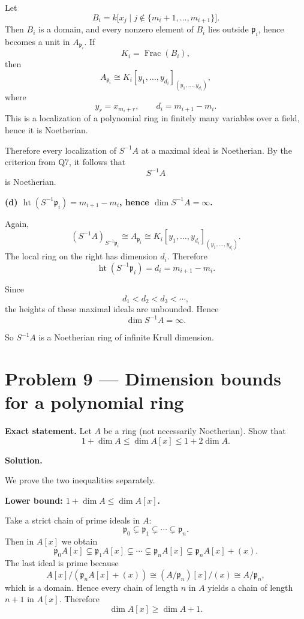 \documentclass[12pt,a4paper]{article}
\theoremstyle{plain}
\theoremstyle{definition}      %
\begin{document}
	Let
	\[
	B_i = k\big[x_j \mid j\notin \{m_i+1,\dots,m_{i+1}\}\big].
	\]
	Then \(B_i\) is a domain, and every nonzero element of \(B_i\) lies outside \(\mathfrak p_i\), hence becomes a unit in \(A_{\mathfrak p_i}\). If
	\[
	K_i=\operatorname{Frac}(B_i),
	\]
	then
	\[
	A_{\mathfrak p_i}
	\cong
	K_i[y_1,\dots,y_{d_i}]_{(y_1,\dots,y_{d_i})},
	\]
	where
	\[
	y_r=x_{m_i+r},
	\qquad
	d_i=m_{i+1}-m_i.
	\]
	This is a localization of a polynomial ring in finitely many variables over a field, hence it is Noetherian.
	
	Therefore every localization of \(S^{-1}A\) at a maximal ideal is Noetherian. By the criterion from Q7, it follows that
	\[
	S^{-1}A
	\]
	is Noetherian.
	
	\medskip
	
	\textbf{(d) \(\operatorname{ht}(S^{-1}\mathfrak p_i)=m_{i+1}-m_i\), hence \(\dim S^{-1}A=\infty\).}
	
	Again,
	\[
	(S^{-1}A)_{S^{-1}\mathfrak p_i}\cong A_{\mathfrak p_i}
	\cong
	K_i[y_1,\dots,y_{d_i}]_{(y_1,\dots,y_{d_i})}.
	\]
	The local ring on the right has dimension \(d_i\). Therefore
	\[
	\operatorname{ht}(S^{-1}\mathfrak p_i)=d_i=m_{i+1}-m_i.
	\]
	
	Since
	\[
	d_1<d_2<d_3<\cdots,
	\]
	the heights of these maximal ideals are unbounded. Hence
	\[
	\dim S^{-1}A=\infty.
	\]
	
	So \(S^{-1}A\) is a Noetherian ring of infinite Krull dimension.
	
	\bigskip
	
	\section*{Problem 9 --- Dimension bounds for a polynomial ring}
	
	\textbf{Exact statement.}
	Let \(A\) be a ring (not necessarily Noetherian). Show that
	\[
	1+\dim A \le \dim A[x] \le 1+2\dim A.
	\]
	
	\textbf{Solution.}
	
	We prove the two inequalities separately.
	
	\medskip
	
	\textbf{Lower bound: \(1+\dim A\le \dim A[x]\).}
	
	Take a strict chain of prime ideals in \(A\):
	\[
	\mathfrak p_0\subsetneq \mathfrak p_1\subsetneq \cdots \subsetneq \mathfrak p_n.
	\]
	Then in \(A[x]\) we obtain
	\[
	\mathfrak p_0A[x]
	\subsetneq
	\mathfrak p_1A[x]
	\subsetneq
	\cdots
	\subsetneq
	\mathfrak p_nA[x]
	\subsetneq
	\mathfrak p_nA[x]+(x).
	\]
	The last ideal is prime because
	\[
	A[x]/(\mathfrak p_nA[x]+(x))
	\cong
	(A/\mathfrak p_n)[x]/(x)
	\cong
	A/\mathfrak p_n,
	\]
	which is a domain. Hence every chain of length \(n\) in \(A\) yields a chain of length \(n+1\) in \(A[x]\). Therefore
	\[
	\dim A[x]\ge \dim A+1.
	\]
	
\end{document}
